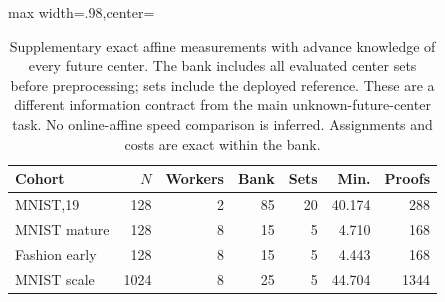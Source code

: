 \begin{table}[tbp]
\centering
\caption{Supplementary exact affine measurements with advance knowledge of every future center. The bank includes all evaluated center sets before preprocessing; sets include the deployed reference. These are a different information contract from the main unknown-future-center task. No online-affine speed comparison is inferred. Assignments and costs are exact within the bank.}
\label{tab:known-family}
\begin{adjustbox}{max width=.98\textwidth,center=\textwidth}
\begin{tabular}{lrrrrrr}
\toprule
Cohort & $N$ & Workers & Bank & Sets & Min. & Proofs\\
\midrule
MNIST,19 & 128 & 2 & 85 & 20 & 40.174 & 288\\
MNIST mature & 128 & 8 & 15 & 5 & 4.710 & 168\\
Fashion early & 128 & 8 & 15 & 5 & 4.443 & 168\\
MNIST scale & 1024 & 8 & 25 & 5 & 44.704 & 1344\\
\bottomrule
\end{tabular}
\end{adjustbox}
\end{table}
